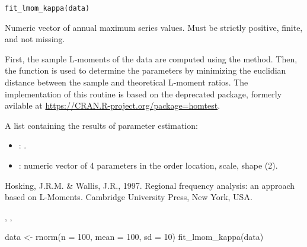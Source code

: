 \documentclass[a4paper]{book}
\begin{document}
%
\begin{Usage}
\begin{verbatim}
fit_lmom_kappa(data)
\end{verbatim}
\end{Usage}
%
\begin{Arguments}
\begin{ldescription}
\item[\code{data}] Numeric vector of annual maximum series values.
Must be strictly positive, finite, and not missing.
\end{ldescription}
\end{Arguments}
%
\begin{Details}
First, the sample L-moments of the data are computed using the 
method. Then, the  function is used to determine the parameters
by minimizing the euclidian distance between the sample and theoretical L-moment
ratios. The implementation of this routine is based on the deprecated 
package, formerly avilable at \url{https://CRAN.R-project.org/package=homtest}.
\end{Details}
%
\begin{Value}
A list containing the results of parameter estimation:
\begin{itemize}

\item{} : .
\item{} : numeric vector of 4 parameters in the order location, scale, shape (2).

\end{itemize}

\end{Value}
%
\begin{References}
Hosking, J.R.M. \& Wallis, J.R., 1997. Regional frequency analysis: an approach based
on L-Moments. Cambridge University Press, New York, USA.
\end{References}
%
\begin{SeeAlso}
, , 
\end{SeeAlso}
%
\begin{Examples}
\begin{ExampleCode}
data <- rnorm(n = 100, mean = 100, sd = 10)
fit_lmom_kappa(data)

\end{ExampleCode}
\end{Examples}
\end{document}
